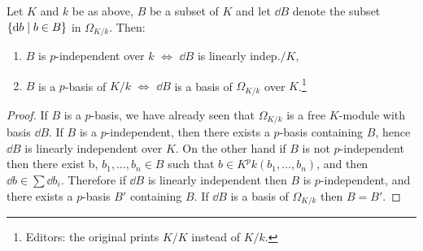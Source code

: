 \documentclass[../main]{subfiles}
\begin{document}
\begin{theorem}
\label{thm:086}
    Let $K$ and $k$ be as above, $B$ be a subset of $K$ and let $\dd{B}$ denote the subset $\left\{\mathrm{d}b \mid b \in B\right\}$ in $\Omega_{K/k}$. Then:
    \begin{enumerate}
    \item[(i)] $B$ is $p$-independent over $k$ $\iff$ $\dd{B}$ is linearly indep.$/K$,
    \item[(ii)] $B$ is a $p$-basis of $K/k$ $\iff$ $\dd{B}$ is a basis of $\Omega_{K/k}$ over $K$.\footnote{Editors: the original prints $K/K$ instead of $K/k$.}
    \end{enumerate}
\end{theorem}
\begin{proof}
    If $B$ is a $p$-basis, we have already seen that $\Omega_{K/k}$ is a free $K$-module with basis $\dd{B}$. If $B$ is a $p$-independent, then there exists a $p$-basis containing $B$, hence $\dd{B}$ is linearly independent over $K$. On the other hand if $B$ is not $p$-independent then there exist b, $b_1, \dots, b_n \in B$ such that $b \in K^pk(b_1, \dots, b_n)$, and then $\dd{b} \in \sum \dd{b}_i$. Therefore if $\dd{B}$ is linearly independent then $B$ is $p$-independent, and there exists a $p$-basis $B'$ containing $B$. If $\dd{B}$ is a basis of $\Omega_{K/k}$ then $B = B'$. 
\end{proof}
\end{document}
